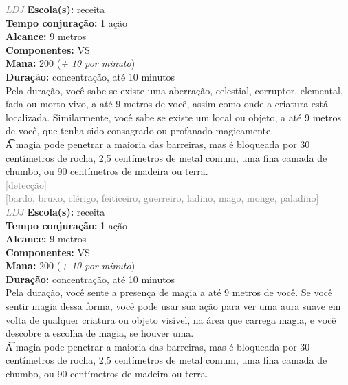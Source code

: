 \documentclass{RPG_Adventure}[2021/10/20]
\begin{document}
{\tiny \textcolor{gray}{\textit{LDJ}}}
{\small \t \textbf{Escola(s):} receita\\\t \textbf{Tempo conjuração:} 1 ação\\\t \textbf{Alcance:} 9 metros\\\t \textbf{Componentes:} VS\\\t \textbf{Mana:} 200 (\textit{+ 10 por minuto})\\\t \textbf{Duração:} concentração, até 10 minutos\\}
{\normalsize Pela duração, você sabe se existe uma aberração, celestial, corruptor, elemental, fada ou morto-vivo, a até 9 metros de você, assim como onde a criatura está localizada. Similarmente, você sabe se existe um local ou objeto, a até 9 metros de você, que tenha sido consagrado ou profanado magicamente.\\\t A magia pode penetrar a maioria das barreiras, mas é bloqueada por 30 centímetros de rocha, 2,5 centímetros de metal comum, uma fina camada de chumbo, ou 90 centímetros de madeira ou terra.\\}
{\scriptsize \textcolor{gray}{[detecção]\\}}
{\scriptsize \textcolor{gray}{[bardo, bruxo, clérigo, feiticeiro, guerreiro, ladino, mago, monge, paladino]\\}}
{\tiny \textcolor{gray}{\textit{LDJ}}}
{\small \t \textbf{Escola(s):} receita\\\t \textbf{Tempo conjuração:} 1 ação\\\t \textbf{Alcance:} 9 metros\\\t \textbf{Componentes:} VS\\\t \textbf{Mana:} 200 (\textit{+ 10 por minuto})\\\t \textbf{Duração:} concentração, até 10 minutos\\}
{\normalsize Pela duração, você sente a presença de magia a até 9 metros de você. Se você sentir magia dessa forma, você pode usar sua ação para ver uma aura suave em volta de qualquer criatura ou objeto visível, na área que carrega magia, e você descobre a escolha de magia, se houver uma.\\\t A magia pode penetrar a maioria das barreiras, mas é bloqueada por 30 centímetros de rocha, 2,5 centímetros de metal comum, uma fina camada de chumbo, ou 90 centímetros de madeira ou terra.\\}
\end{document}
